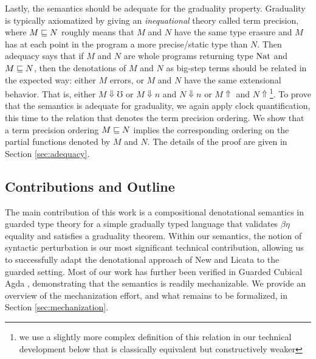 Lastly, the semantics should be adequate for the graduality property. Graduality
is typically axiomatized by giving an \emph{inequational} theory called term
precision, where $M \sqsubseteq N$ roughly means that $M$ and $N$ have the same type
erasure and $M$ has at each point in the program a more precise/static type than
$N$. Then adequacy says that if $M$ and $N$ are whole programs returning type
$\text{Nat}$ and $M \sqsubseteq N$, then the denotations of $M$ and $N$ as big-step terms
should be related in the expected way: either $M$ errors, or $M$ and $N$ have
the same extensional behavior. That is, either $M\Downarrow \mho$ or $M
\Downarrow n $ and $N \Downarrow n$ or $M \Uparrow $ and $N
\Uparrow$\footnote{we use a slightly more complex definition of this relation in
our technical development below that is classically equivalent but
constructively weaker}.
%
To prove that the semantics is adequate for graduality, we again apply clock
quantification, this time to the relation that denotes the term precision
ordering. We show that a term precision ordering $M \sqsubseteq N$ implies the
corresponding ordering on the partial functions denoted by $M$ and $N$. The
details of the proof are given in Section \ref{sec:adequacy}.





\subsection{Contributions and Outline}

The main contribution of this work is a compositional denotational semantics in
guarded type theory for a simple gradually typed language that validates
$\beta\eta$ equality and satisfies a graduality theorem.
%
%
Within our semantics, the notion of syntactic perturbation is our most
significant technical contribution, allowing us to successfully adapt the
denotational approach of New and Licata to the guarded setting.
%
Most of our work has further been verified in Guarded Cubical Agda
\cite{veltri-vezzosi2020}, demonstrating that the semantics is readily
mechanizable. We provide an overview of the mechanization effort, and what
remains to be formalized, in Section \ref{sec:mechanization}.
%


